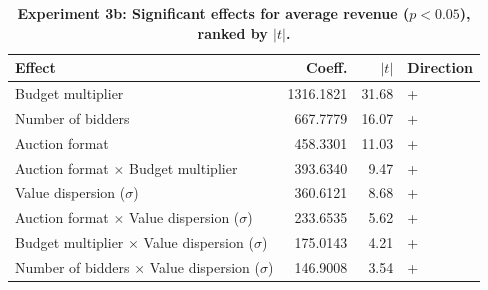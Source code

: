 \begin{table}[H]
\centering
\caption[Experiment 3b: Significant effects for average revenue ($p < 0.05$), ranked by $|t|$]{\textbf{Experiment 3b: Significant effects for average revenue ($p < 0.05$), ranked by $|t|$.}}
\label{tab:exp3b_ranked_rev}
\begin{tabular}{lrrl}
\toprule
\textbf{Effect} & \textbf{Coeff.} & \textbf{$|t|$} & \textbf{Direction} \\
\midrule
Budget multiplier & 1316.1821 & 31.68 & + \\
Number of bidders & 667.7779 & 16.07 & + \\
Auction format & 458.3301 & 11.03 & + \\
Auction format $\times$ Budget multiplier & 393.6340 & 9.47 & + \\
Value dispersion ($\sigma$) & 360.6121 & 8.68 & + \\
Auction format $\times$ Value dispersion ($\sigma$) & 233.6535 & 5.62 & + \\
Budget multiplier $\times$ Value dispersion ($\sigma$) & 175.0143 & 4.21 & + \\
Number of bidders $\times$ Value dispersion ($\sigma$) & 146.9008 & 3.54 & + \\
\bottomrule
\end{tabular}
\end{table}
